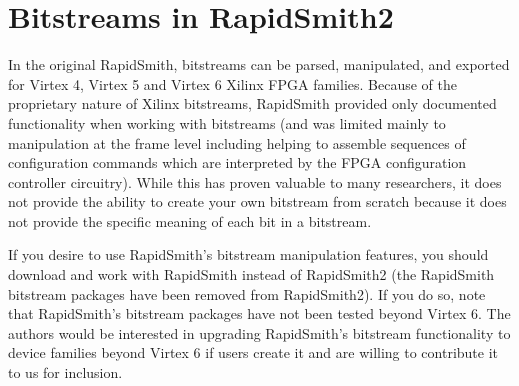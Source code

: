 \newpage
\section{Bitstreams in RapidSmith2}

In the original RapidSmith, bitstreams can be parsed, manipulated, and exported
for Virtex 4, Virtex 5 and Virtex 6 Xilinx FPGA families.  Because of the
proprietary nature of Xilinx bitstreams, RapidSmith provided only documented
functionality when working with bitstreams (and was limited mainly to
manipulation at the frame level including helping to assemble sequences of
configuration commands which are interpreted by the FPGA configuration
controller circuitry).  While this has proven valuable to many researchers, it
does not provide the ability to create your own bitstream from scratch because
it does not provide the specific meaning of each bit in a bitstream.

If you desire to use RapidSmith's bitstream manipulation features, you should
download and work with RapidSmith instead of RapidSmith2 (the RapidSmith bitstream
packages have been removed from RapidSmith2).  If you do so, note that RapidSmith's
bitstream packages have not been tested beyond Virtex 6.  The authors would be
interested in upgrading RapidSmith's bitstream functionality to device families
beyond Virtex 6 if users create it and are willing to contribute it to us for
inclusion.